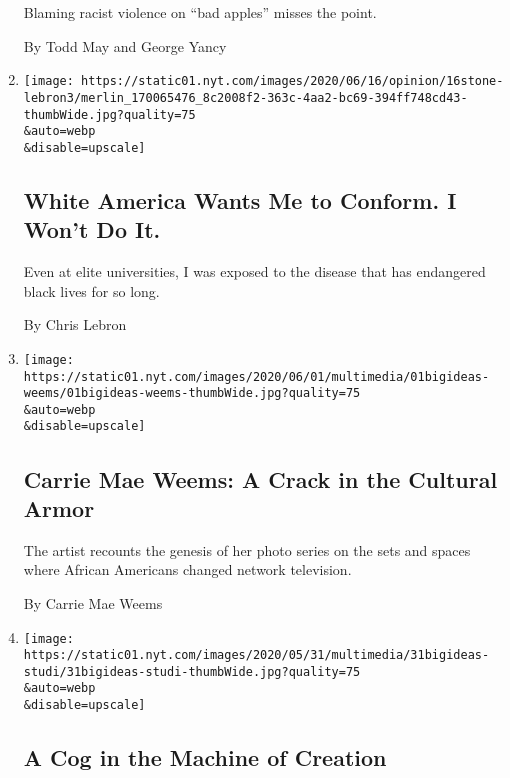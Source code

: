 \begin{enumerate}
  Blaming racist violence on ``bad apples'' misses the point.

  By Todd May and George Yancy
\item
  \href{/2020/06/16/opinion/black-academia-racism.html}{}

  \texttt{[image: https://static01.nyt.com/images/2020/06/16/opinion/16stone-lebron3/merlin\_170065476\_8c2008f2-363c-4aa2-bc69-394ff748cd43-thumbWide.jpg?quality=75\\\&auto=webp\\\&disable=upscale]}

  \hypertarget{white-america-wants-me-to-conform-i-wont-do-it}{%
  \subsection{White America Wants Me to Conform. I Won't Do
  It.}\label{white-america-wants-me-to-conform-i-wont-do-it}}

  Even at elite universities, I was exposed to the disease that has
  endangered black lives for so long.

  By Chris Lebron
\item
  \href{/2020/06/01/opinion/carrie-mae-weems-black-television.html}{}

  \texttt{[image: https://static01.nyt.com/images/2020/06/01/multimedia/01bigideas-weems/01bigideas-weems-thumbWide.jpg?quality=75\\\&auto=webp\\\&disable=upscale]}

  \hypertarget{carrie-mae-weems-a-crack-in-the-cultural-armor}{%
  \subsection{Carrie Mae Weems: A Crack in the Cultural
  Armor}\label{carrie-mae-weems-a-crack-in-the-cultural-armor}}

  The artist recounts the genesis of her photo series on the sets and
  spaces where African Americans changed network television.

  By Carrie Mae Weems
\item
  \href{/2020/05/31/opinion/acting-movies-art.html}{}

  \texttt{[image: https://static01.nyt.com/images/2020/05/31/multimedia/31bigideas-studi/31bigideas-studi-thumbWide.jpg?quality=75\\\&auto=webp\\\&disable=upscale]}

  \hypertarget{a-cog-in-the-machine-of-creation}{%
  \subsection{A Cog in the Machine of
  Creation}\label{a-cog-in-the-machine-of-creation}}


\end{enumerate}
